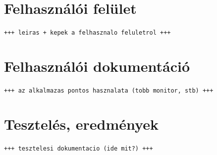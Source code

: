 \section{Felhasználói felület}\label{sect:gui}

\texttt{+++ leiras + kepek a felhasznalo feluletrol +++}

\section{Felhasználói dokumentáció}\label{sect:docs}

\texttt{+++ az alkalmazas pontos hasznalata (tobb monitor, stb) +++}

\section{Tesztelés, eredmények}\label{sect:teszteles}

\texttt{+++ tesztelesi dokumentacio (ide mit?) +++}